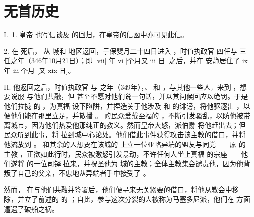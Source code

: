 
\chapter{无首历史}


I.~1. 皇帝  也写信谈及  的回归，在皇帝的信函中亦可见此信。\par

2. 在  死后， 从  城和  地区返回，于保斐月二十四日进入 ，时值执政官  四任与  三任之年（346年10月21日）；即 [vii] 年 vi [个月又 iii 日] 之后，并在  安静居住了 ix 年 iii 个月 [又 xix 日]。\par

II. 他返回之后，时值执政官  与  之年（349年），、 和 ，与其他一些人，来到 ，想要说服  与他们共融，但  甚至不愿对他们说一句话，并以其问候回应以绝罚。于是他们拉拢  的 ，为真福  设下陷阱，并捏造关于他涉及  和  的诽谤，将他驱逐出 ，以便他们能在那里立足，并散播 。 的民众爱戴至福的 ，不断引发骚乱，以防他被带离城市，因为他们热爱他那纯正的教义。然而皇帝大怒，派伯爵  将他赶出去；但民众听到此事，将  拉到城中心论处。他们借此事件获得攻击该主教的借口，并将他流放到 。 和其余的人想要在该城的  上立一位亚略异端的盟友与同党——原  的主教 ，正欲如此行时，民众被激怒引发暴动，不许任何人坐上真福  的宗座——他们遂将  的一位司铎  拉来，并祝圣他为  城的主教；全体主教集会谴责他，因为他背叛了自己的父亲，不忠地从异端者手中接受了 。\par

然而， 在与他们共融并签署后，他们便寻来无关紧要的借口，将他从教会中移除，并立了前述的  的 ；自此，参与这次分裂的人被称为马塞多尼派，他们在  方面遭遇了破船之祸。\par

